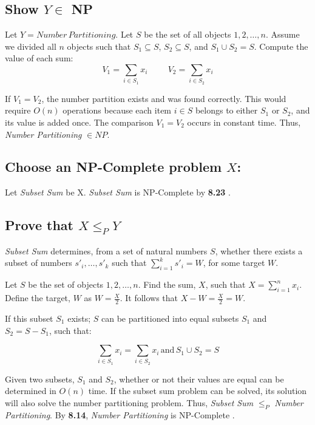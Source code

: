 \documentclass{article}
\begin{document}
\subsection*{Show $Y \in$ NP}
Let $Y = Number \, Partitioning$.
Let $S$ be the set of all objects $1, 2, \dots , n$.  Assume we divided all $n$ objects such that $S_1 \subseteq S$, $S_2 \subseteq S$, and $S_1 \cup S_2 = S$.
Compute the value of each sum:
$$
V_1 = \sum_{i \in S_1} x_i  \hspace{1cm} V_2 = \sum_{i \in S_2} x_i
$$

\noindent If $V_1 = V_2$, the number partition exists and was found correctly.  This would require $O(n)$ operations because each item $i \in S$ belongs to either $S_1$ or $S_2$, and its value is added once.
The comparison $V_1 = V_2$ occurs in constant time.  
Thus, \textit{Number Partitioning} $\in NP$.

\subsection*{Choose an NP-Complete problem $X$:}
Let \textit{Subset Sum} be X.  \textit{Subset Sum} is NP-Complete by \textbf{8.23} \cite{algDesign}.

\subsection*{Prove that $X \leq_P Y$}
\textit{Subset Sum} determines, from a set of natural numbers $S$, whether there exists a subset of numbers $s'_i, \dots , s'_k$ such that $\sum_{i=1}^{k} s'_i = W$, for some target $W$.

Let $S$ be the set of objects $1, 2, \dots , n$.  
Find the sum, $X$, such that $X = \sum_{i=1}^n x_i$.  
Define the target, $W$ as $W = \frac{X}{2}$.  
It follows that $X - W = \frac{X}{2} = W$.

If this subset $S_1$ exists; $S$ can be partitioned into equal subsets $S_1$ and $S_2 = S - S_1$, such that:

$$
 \sum_{i \in S_1} x_i = \sum_{i \in S_2} x_i \, \mathrm{and} \, S_1 \cup S_2 = S
$$

\noindent Given two subsets, $S_1$ and $S_2$, whether or not their values are equal can be determined in $O(n)$ time.  
If the subset sum problem can be solved, its solution will also solve the number partitioning problem. \newline
\noindent Thus, \textit{Subset Sum} $\leq_P$ \textit{Number Partitioning}.  By \textbf{8.14}, \textit{Number Partitioning} is NP-Complete \cite{algDesign}.

\printbibliography
\end{document}
